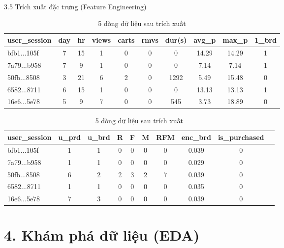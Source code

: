 \documentclass[aspectratio=169, 11pt]{beamer}
\begin{document}
\begin{frame}{3.5 Trích xuất đặc trưng (Feature Engineering)}
\begin{table}[H]
    \centering
    \caption{5 dòng dữ liệu sau trích xuất }
    \label{tab:session_features_1}
    \begin{tabular}{l cccc cccc c}
        \toprule
        \textbf{user\_session} & \textbf{day} & \textbf{hr} & \textbf{views} & \textbf{carts} & \textbf{rmvs} & \textbf{dur(s)} & \textbf{avg\_p} & \textbf{max\_p} & \textbf{1\_brd} \\
        \midrule
        bfb1...105f & 7 & 15 & 1 & 0 & 0 & 0    & 14.29 & 14.29 & 1 \\
        7a79...b958 & 7 & 9  & 1 & 0 & 0 & 0    & 7.14  & 7.14  & 1 \\
        50fb...8508 & 3 & 21 & 6 & 2 & 0 & 1292 & 5.49  & 15.48 & 0 \\
        6582...8711 & 6 & 15 & 1 & 0 & 0 & 0    & 13.13 & 13.13 & 1 \\
        16e6...5e78 & 5 & 9  & 7 & 0 & 0 & 545  & 3.73  & 18.89 & 0 \\
        \bottomrule
    \end{tabular}
    
    
    \begin{tabular}{l cc cccc c cc}
        \toprule
        \textbf{user\_session} & \textbf{u\_prd} & \textbf{u\_brd} & \textbf{R} & \textbf{F} & \textbf{M} & \textbf{RFM} & \textbf{enc\_brd} & \textbf{is\_purchased} \\
        \midrule
        bfb1...105f & 1 & 1 & 0 & 0 & 0 & 0 & 0.039 & 0 \\
        7a79...b958 & 1 & 1 & 0 & 0 & 0 & 0 & 0.029 & 0 \\
        50fb...8508 & 6 & 2 & 2 & 3 & 2 & 7 & 0.039 & 0 \\
        6582...8711 & 1 & 1 & 0 & 0 & 0 & 0 & 0.035 & 0 \\
        16e6...5e78 & 7 & 3 & 0 & 0 & 0 & 0 & 0.039 & 0 \\
        \bottomrule
    \end{tabular}
\end{table}
\end{frame}
\section{4. Khám phá dữ liệu (EDA)}
\end{document}
